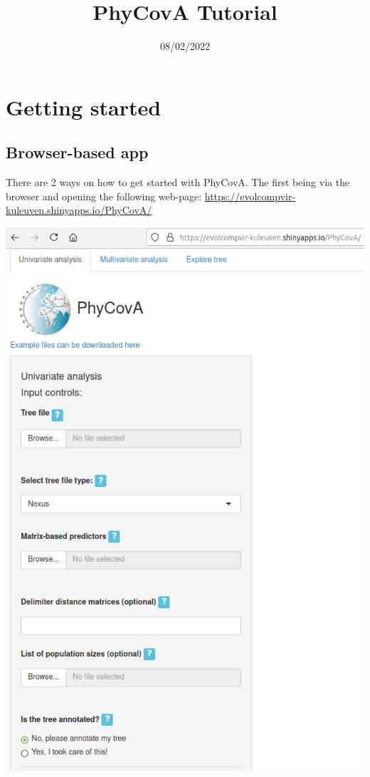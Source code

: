 \documentclass[
]{article}
\title{PhyCovA Tutorial}
\author{}
\date{\vspace{-2.5em}08/02/2022}
\begin{document}
\maketitle

{
\setcounter{tocdepth}{3}
\tableofcontents
}
\hypertarget{getting-started}{%
\section{Getting started}\label{getting-started}}

\hypertarget{browser-based-app}{%
\subsection{Browser-based app}\label{browser-based-app}}

There are 2 ways on how to get started with PhyCovA. The first being via
the browser and opening the following web-page:
\url{https://evolcompvir-kuleuven.shinyapps.io/PhyCovA/}

\includegraphics{tutorial_img/evolcompvir_start_up.png}
\end{document}
